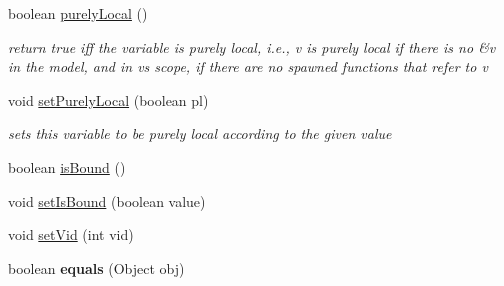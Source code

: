 \begin{DoxyCompactItemize}
\item 
boolean \hyperlink{classedu_1_1udel_1_1cis_1_1vsl_1_1civl_1_1model_1_1common_1_1variable_1_1CommonVariable_a473e5e71901ff6f70aafee4ae948cb3f}{purely\+Local} ()
\begin{DoxyCompactList}\small\item\em return true iff the variable is purely local, i.\+e., v is purely local if there is no \&v in the model, and in v\textquotesingle{}s scope, if there are no spawned functions that refer to v \end{DoxyCompactList}\item 
void \hyperlink{classedu_1_1udel_1_1cis_1_1vsl_1_1civl_1_1model_1_1common_1_1variable_1_1CommonVariable_a70b69f2fffa7503583e6d45b192518ef}{set\+Purely\+Local} (boolean pl)
\begin{DoxyCompactList}\small\item\em sets this variable to be purely local according to the given value \end{DoxyCompactList}\item 
boolean \hyperlink{classedu_1_1udel_1_1cis_1_1vsl_1_1civl_1_1model_1_1common_1_1variable_1_1CommonVariable_aa5881c99b1ee07e2e464a05464357bc8}{is\+Bound} ()
\item 
void \hyperlink{classedu_1_1udel_1_1cis_1_1vsl_1_1civl_1_1model_1_1common_1_1variable_1_1CommonVariable_aff12b34862d6fc800b64d1248d47c00a}{set\+Is\+Bound} (boolean value)
\item 
void \hyperlink{classedu_1_1udel_1_1cis_1_1vsl_1_1civl_1_1model_1_1common_1_1variable_1_1CommonVariable_a2c7b7555f7a77ac70d9c210cb82f86ff}{set\+Vid} (int vid)
\item 
\hypertarget{classedu_1_1udel_1_1cis_1_1vsl_1_1civl_1_1model_1_1common_1_1variable_1_1CommonVariable_a878c02fb394bcf51ba136ad44e61fce1}{}boolean {\bfseries equals} (Object obj)\label{classedu_1_1udel_1_1cis_1_1vsl_1_1civl_1_1model_1_1common_1_1variable_1_1CommonVariable_a878c02fb394bcf51ba136ad44e61fce1}


\end{DoxyCompactItemize}
